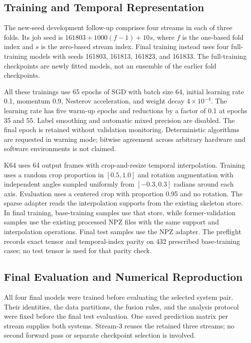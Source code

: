 \documentclass[ai,article,submit,moreauthors]{Definitions/mdpi}
\begin{document}
\subsection{Training and Temporal Representation}

The new-seed development follow-up comprises four streams in each of three
folds. Its job seed is $161803+1000(f-1)+10s$, where $f$ is the one-based
fold index and $s$ is the zero-based stream index. Final training instead
uses four full-training models with seeds 161803, 161813, 161823, and 161833.
The full-training checkpoints are newly fitted models, not an ensemble of
the earlier fold checkpoints.

All these trainings use 65 epochs of SGD with batch size 64, initial learning
rate 0.1, momentum 0.9, Nesterov acceleration, and weight decay
$4\times10^{-4}$. The learning rate has five warm-up epochs and reductions
by a factor of 0.1 at epochs 35 and 55. Label smoothing and automatic mixed
precision are disabled. The final epoch is retained without validation
monitoring. Deterministic algorithms are requested in warning mode;
bitwise agreement across arbitrary hardware and software environments is
not claimed.

K64 uses 64 output frames with crop-and-resize temporal interpolation.
Training uses a random crop proportion in $[0.5,1.0]$ and rotation augmentation
with independent angles sampled uniformly from $[-0.3,0.3]$ radians around each axis. Evaluation uses a centered crop with
proportion 0.95 and no rotation. The sparse adapter reads the interpolation
supports from the existing skeleton store. In final training, base-training
samples use that store, while former-validation samples use the existing
processed NPZ files with the same support and interpolation operations.
Final test samples use the NPZ adapter. The preflight records exact tensor
and temporal-index parity on 432 prescribed base-training cases; no test
tensor is used for that parity check.

\subsection{Final Evaluation and Numerical Reproduction}
All four final models were trained before evaluating the selected system pair. Their identities, the data partitions, the fusion rules, and the analysis protocol were fixed before the final test evaluation. One saved prediction matrix per stream supplies both systems. Stream-3 reuses the retained three streams; no second forward pass or separate checkpoint selection is involved.
\end{document}
